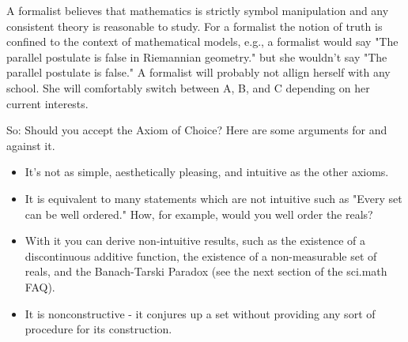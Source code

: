 A formalist believes that mathematics is strictly symbol manipulation and any
consistent theory is reasonable to study.  For a formalist the notion of truth
is confined to the context of mathematical models, e.g., a formalist would say
"The parallel postulate is false in Riemannian geometry." but she wouldn't say
"The parallel postulate is false."  A formalist will probably not allign
herself with any school.  She will comfortably switch between A, B, and C
depending on her current interests.


So: Should you accept the Axiom of Choice?  Here are some arguments
for and against it.

\medskip
{}

\begin{itemize}
\item It's not as simple, aesthetically pleasing, and intuitive as the other
  axioms.
\item It is equivalent to many statements which are not intuitive such as "Every
  set can be well ordered."  How, for example, would you well order the reals?
\item With it you can derive non-intuitive results, such as the existence of a
  discontinuous additive function, the existence of a non-measurable set of
  reals, and the Banach-Tarski Paradox (see the next section of the sci.math
  FAQ).
\item It is nonconstructive - it conjures up a set without providing any sort of
  procedure for its construction.
\end{itemize}

\smallskip

